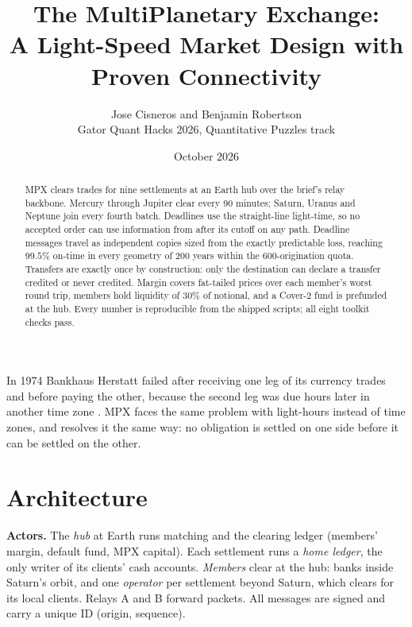 \documentclass[11pt]{article}
\title{The MultiPlanetary Exchange:\\ A Light-Speed Market Design with Proven Connectivity}
\author{Jose Cisneros and Benjamin Robertson\\ \small Gator Quant Hacks 2026, Quantitative Puzzles track}
\date{October 2026}
\theoremstyle{definition}
\theoremstyle{remark}
\begin{document}
\maketitle
\begin{abstract}
MPX clears trades for nine settlements at an Earth hub over the brief's relay backbone. Mercury through Jupiter clear every 90 minutes; Saturn, Uranus and Neptune join every fourth batch. Deadlines use the straight-line light-time, so no accepted order can use information from after its cutoff on any path. Deadline messages travel as independent copies sized from the exactly predictable loss, reaching $99.5\%$ on-time in every geometry of 200 years within the 600-origination quota. Transfers are exactly once by construction: only the destination can declare a transfer credited or never credited. Margin covers fat-tailed prices over each member's worst round trip, members hold liquidity of $30\%$ of notional, and a Cover-2 fund is prefunded at the hub. Every number is reproducible from the shipped scripts; all eight toolkit checks pass.
\end{abstract}
\vspace{-4pt}
\noindent{}
\vspace{2pt}

In 1974 Bankhaus Herstatt failed after receiving one leg of its currency trades and before paying the other, because the second leg was due hours later in another time zone \cite{bisfx}. MPX faces the same problem with light-hours instead of time zones, and resolves it the same way: no obligation is settled on one side before it can be settled on the other.
\vspace{-6pt}
\section{Architecture}\label{sec:arch}
\textbf{Actors.} The \emph{hub} at Earth runs matching and the clearing ledger (members' margin, default fund, MPX capital). Each settlement runs a \emph{home ledger}, the only writer of its clients' cash accounts. \emph{Members} clear at the hub: banks inside Saturn's orbit, and one \emph{operator} per settlement beyond Saturn, which clears for its local clients. Relays A and B forward packets. All messages are signed and carry a unique ID (origin, sequence).
\end{document}
